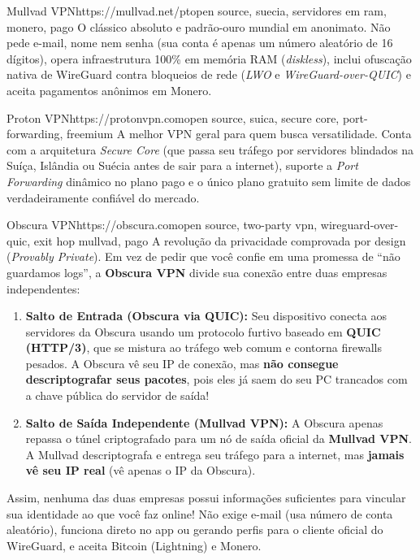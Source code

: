 \documentclass{pousadaguide}
\begin{document}
\begin{ferramenta}[goat,logo=mullvad]{Mullvad VPN}{https://mullvad.net/pt}{open source, suecia, servidores em ram, monero, pago}
O clássico absoluto e padrão-ouro mundial em anonimato. Não pede e-mail, nome nem senha (sua conta é apenas um número aleatório de 16 dígitos), opera infraestrutura 100\% em memória RAM (\emph{diskless}), inclui ofuscação nativa de WireGuard contra bloqueios de rede (\emph{LWO} e \emph{WireGuard-over-QUIC}) e aceita pagamentos anônimos em Monero. 
\end{ferramenta}

\begin{ferramenta}[goat,logo=proton]{Proton VPN}{https://protonvpn.com}{open source, suica, secure core, port-forwarding, freemium}
A melhor VPN geral para quem busca versatilidade. Conta com a arquitetura \emph{Secure Core} (que passa seu tráfego por servidores blindados na Suíça, Islândia ou Suécia antes de sair para a internet), suporte a \emph{Port Forwarding} dinâmico no plano pago e o único plano gratuito sem limite de dados verdadeiramente confiável do mercado. 
\end{ferramenta}

\begin{ferramenta}[goat,logo=obscura]{Obscura VPN}{https://obscura.com}{open source, two-party vpn, wireguard-over-quic, exit hop mullvad, pago}
A revolução da privacidade comprovada por design (\emph{Provably Private}). Em vez de pedir que você confie em uma promessa de ``não guardamos logs'', a \textbf{Obscura VPN} divide sua conexão entre duas empresas independentes:
\begin{enumerate}
  \item \textbf{Salto de Entrada (Obscura via QUIC):} Seu dispositivo conecta aos servidores da Obscura usando um protocolo furtivo baseado em \textbf{QUIC (HTTP/3)}, que se mistura ao tráfego web comum e contorna firewalls pesados. A Obscura vê seu IP de conexão, mas \textbf{não consegue descriptografar seus pacotes}, pois eles já saem do seu PC trancados com a chave pública do servidor de saída!
  \item \textbf{Salto de Saída Independente (Mullvad VPN):} A Obscura apenas repassa o túnel criptografado para um nó de saída oficial da \textbf{Mullvad VPN}. A Mullvad descriptografa e entrega seu tráfego para a internet, mas \textbf{jamais vê seu IP real} (vê apenas o IP da Obscura).
\end{enumerate}
Assim, nenhuma das duas empresas possui informações suficientes para vincular sua identidade ao que você faz online! Não exige e-mail (usa número de conta aleatório), funciona direto no app ou gerando perfis para o cliente oficial do WireGuard, e aceita Bitcoin (Lightning) e Monero. 
\end{ferramenta}
\end{document}
